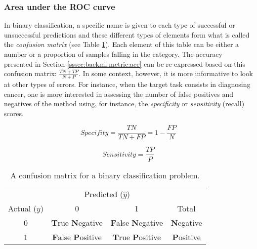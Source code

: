 \subsubsection{Area under the ROC curve}
\label{sssec:backml:metric:rocauc}

In binary classification, a specific name is given to each type of successful or unsuccessful predictions and these different types of elements form what is called the \textit{confusion matrix} (see Table \ref{tab:backml:confusion}). Each element of this table can be either a number or a proportion of samples falling in the category. The accuracy presented in Section \ref{sssec:backml:metric:acc} can be re-expressed based on this confusion matrix: $\frac{TN + TP}{N + P}$. In some context, however, it is more informative to look at other types of errors. For instance, when the target task consists in diagnosing cancer, one is more interested in assessing the number of false positives and negatives of the method using, for instance, the \textit{specificity} or \textit{sensitivity} (\aka recall) scores.

\begin{equation}
\label{eqn:backml:specifity}
\textit{Specifity} = \frac{TN}{TN + FP} = 1 - \frac{FP}{N}
\end{equation}

\begin{equation}
\label{eqn:backml:sensitivity}
\textit{Sensitivity} = \frac{TP}{P}
\end{equation}

\begin{table}
  \centering
  \begin{tabular}{c|cc|c}
  & \multicolumn{2}{c}{Predicted ($\hat{y}$)} & \\
  Actual ($y$) & 0 & 1 & Total \\
  \hline
  0 & \textbf{T}rue \textbf{N}egative & \textbf{F}alse \textbf{N}egative & \textbf{N}egative \\
  1 & \textbf{F}alse \textbf{P}ositive & \textbf{T}rue \textbf{P}ositive & \textbf{P}ositive \\
  \end{tabular}
  \caption{A confusion matrix for a binary classification problem.}
  \label{tab:backml:confusion}
\end{table}

